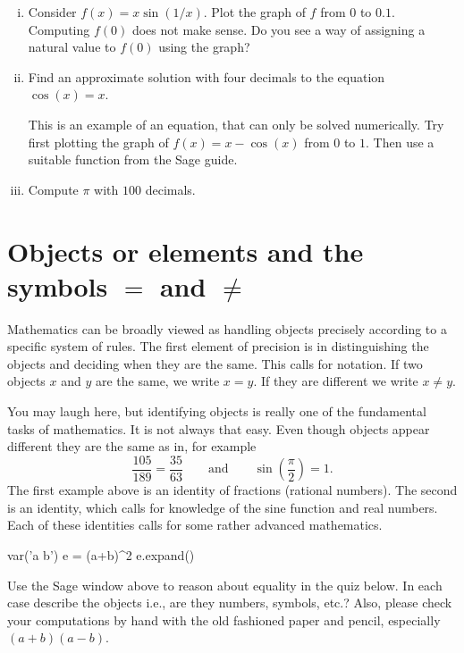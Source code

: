 \documentclass{article}
\begin{document}
\begin{enumerate}[(i)]
\item Consider $f(x) = x \sin(1/x)$. Plot the graph of $f$ from $0$ to $0.1$. Computing $f(0)$ does not make sense. Do you
  see a way of assigning a natural value to $f(0)$ using the graph?
\item Find an approximate solution with four decimals to the equation $\cos(x) = x$.
  
  \begin{hint}[showhide]
    This is an example of an equation, that can only be solved numerically.
    Try first plotting the graph of $f(x) = x - \cos(x)$ from $0$ to $1$. Then use a
    suitable function from the Sage guide.
    \end{hint}
\item Compute $\pi$ with $100$ decimals.
\end{enumerate}
  
\endshex





\section{Objects or elements and the symbols $=$ and $\neq$}\label{eqobjects}

Mathematics can be broadly viewed as handling objects precisely
according to a specific system of rules. The first element
of precision is in distinguishing the objects and deciding when
they are the same. This calls for notation. If two objects
$x$ and $y$ are the same, we write $x = y$. If they are different
we write $x\neq y$.

You may laugh here, but identifying objects is really one of the fundamental tasks of mathematics.
It is not always that easy. Even though objects appear different they are the same as
in, for example
$$
\frac{105}{189} = \frac{35}{63}\qquad\text{and}\qquad \sin\left(\frac{\pi}{2}\right) = 1.
$$
The first example above is an identity of fractions (rational numbers). The second is
an identity, which calls for knowledge of the sine function and real numbers. Each of these
identities calls for some rather advanced mathematics.


\beginshex\label{sagecompex1}

\begin{sage}
var('a b')
e = (a+b)^2
e.expand()
\end{sage}

Use the Sage window above to reason 
about equality in the quiz below. In each case describe the objects i.e.,
are they numbers, symbols, etc.? Also, please check your computations
by hand with the old fashioned paper and pencil, especially $(a+b)(a-b)$.
\end{document}
